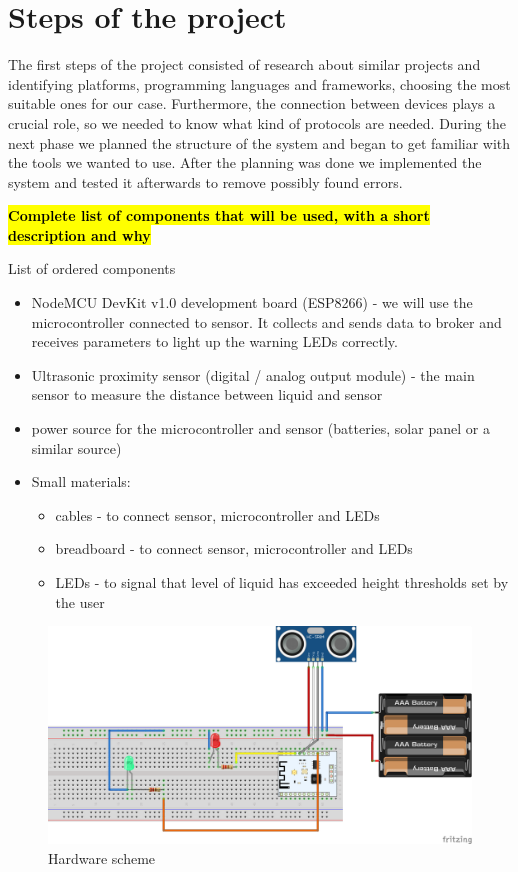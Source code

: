\documentclass{article}
\begin{document}
\section{Steps of the project}

The first steps of the project consisted of research about similar projects and
identifying platforms, programming languages and frameworks, choosing the most
suitable ones for our case. Furthermore, the connection between devices plays a
crucial role, so we needed to know what kind of protocols are needed. During the
next phase we planned the structure of the system and began to get familiar with
the tools we wanted to use. After the planning was done we implemented the
system and tested it afterwards to remove possibly found errors.\par

\textcolor{red}{\textbf{\hl{Complete list of components that will be used, with
      a short description and why}}}

List of ordered components
\begin{itemize}
\item NodeMCU DevKit v1.0 development board (ESP8266) - we will use the
  microcontroller connected to sensor. It collects and sends data to broker and
  receives parameters to light up the warning LEDs correctly.
\item Ultrasonic proximity sensor (digital / analog output module) - the main
  sensor to measure the distance between liquid and sensor
\item power source for the microcontroller and sensor (batteries, solar panel or
  a similar source)
\item Small materials:
	\begin{itemize}
  \item cables - to connect sensor, microcontroller and LEDs
  \item breadboard - to connect sensor, microcontroller and LEDs
  \item LEDs - to signal that level of liquid has exceeded height thresholds set
    by the user
	\end{itemize}
\end{itemize}

\begin{figure}[]
	\centering \includegraphics[scale=0.4]{images/schema_bb.png}
	\caption{Hardware scheme}
	\label{schema_bb}
\end{figure}
\end{document}
